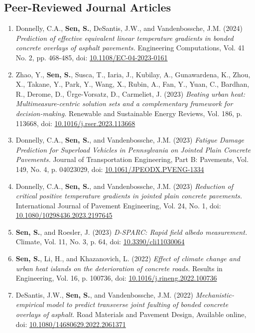 \documentclass[12pt]{article}
\begin{document}
\subsection*{Peer-Reviewed Journal Articles}
\begin{enumerate}
	\item Donnelly, C.A., \textbf{Sen, S.}, DeSantis, J.W., and Vandenbossche, J.M. (2024) \textit{Prediction of effective equivalent linear temperature gradients in bonded concrete overlays of asphalt pavements.}  Engineering Computations, Vol. 41 No. 2, pp. 468-485, doi: \href{https://doi.org/10.1108/EC-04-2023-0161}{10.1108/EC-04-2023-0161}
	\item Zhao, Y., \textbf{Sen, S.}, Susca, T., Iaria, J., Kubilay, A., Gunawardena, K., Zhou, X., Takane, Y., Park, Y., Wang, X., Rubin, A., Fan, Y., Yuan, C., Bardhan, R., Derome, D., Ürge-Vorsatz, D., Carmeliet, J. (2023) \textit{Beating urban heat: Multimeasure-centric solution sets and a complementary framework for decision-making.} Renewable and Sustainable Energy Reviews, Vol. 186, p. 113668, doi: \href{https://doi.org/10.1016/j.rser.2023.113668}{10.1016/j.rser.2023.113668}
	\item Donnelly, C.A., \textbf{Sen, S.}, and Vandenbossche, J.M. (2023) \textit{Fatigue Damage Prediction for Superload Vehicles in Pennsylvania on Jointed Plain Concrete Pavements.}  Journal of Transportation Engineering, Part B: Pavements, Vol. 149, No. 4, p. 04023029, doi: \href{https://doi.org/10.1061/JPEODX.PVENG-1334}{10.1061/JPEODX.PVENG-1334}
	\item Donnelly, C.A., \textbf{Sen, S.}, and Vandenbossche, J.M. (2023) \textit{Reduction of critical positive temperature gradients in jointed plain concrete pavements.}  International Journal of Pavement Engineering, Vol. 24, No. 1, doi: \href{https://doi.org/10.1080/10298436.2023.2197645}{10.1080/10298436.2023.2197645}
	\item \textbf{Sen, S.}, and Roesler, J. (2023) \textit{D-SPARC: Rapid field albedo measurement.}  Climate, Vol. 11, No. 3, p. 64, doi: \href{https://doi.org/10.3390/cli11030064}{10.3390/cli11030064}
	\item \textbf{Sen, S.}, Li, H., and Khazanovich, L. (2022) \textit{Effect of climate change and urban heat islands on the deterioration of concrete roads.} Results in Engineering, Vol. 16, p. 100736, doi: \href{https://doi.org/10.1016/j.rineng.2022.100736}{10.1016/j.rineng.2022.100736}
	\item DeSantis, J.W., \textbf{Sen, S.}, and Vandenbossche, J.M. (2022) \textit{Mechanistic-empirical model to predict transverse joint faulting of bonded concrete overlays of asphalt.} Road Materials and Pavement Design, Available online, doi: \href{https://doi.org/10.1080/14680629.2022.2061371}{10.1080/14680629.2022.2061371}

\end{enumerate}
\end{document}
